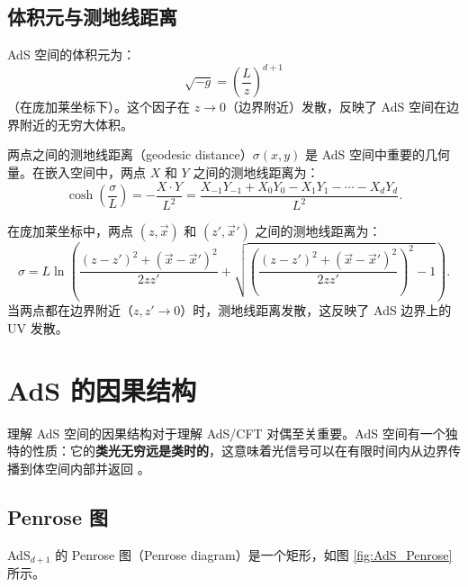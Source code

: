 \subsection{体积元与测地线距离}

AdS 空间的体积元为：
\begin{equation}
    \sqrt{-g} = \left(\frac{L}{z}\right)^{d+1}
\end{equation}
（在庞加莱坐标下）。这个因子在 $z \to 0$（边界附近）发散，反映了 AdS 空间在边界附近的无穷大体积。

两点之间的测地线距离（geodesic distance）$\sigma(x, y)$ 是 AdS 空间中重要的几何量。在嵌入空间中，两点 $X$ 和 $Y$ 之间的测地线距离为：
\begin{equation}
    \cosh\left(\frac{\sigma}{L}\right) = -\frac{X \cdot Y}{L^2} = \frac{X_{-1} Y_{-1} + X_0 Y_0 - X_1 Y_1 - \cdots - X_d Y_d}{L^2}.
\end{equation}

\begin{example}[庞加莱坐标中的测地线距离]
在庞加莱坐标中，两点 $(z, \vec{x})$ 和 $(z', \vec{x}')$ 之间的测地线距离为：
\begin{equation}
    \sigma = L \ln\left(\frac{(z - z')^2 + (\vec{x} - \vec{x}')^2}{2zz'} + \sqrt{\left(\frac{(z - z')^2 + (\vec{x} - \vec{x}')^2}{2zz'}\right)^2 - 1}\right).
\end{equation}
当两点都在边界附近（$z, z' \to 0$）时，测地线距离发散，这反映了 AdS 边界上的 UV 发散。
\end{example}

\section{AdS 的因果结构}

理解 AdS 空间的因果结构对于理解 AdS/CFT 对偶至关重要。AdS 空间有一个独特的性质：它的\textbf{类光无穷远是类时的}，这意味着光信号可以在有限时间内从边界传播到体空间内部并返回 \cite{Witten1998}。

\subsection{Penrose 图}

AdS$_{d+1}$ 的 Penrose 图（Penrose diagram）是一个矩形，如图 \ref{fig:AdS_Penrose} 所示。

